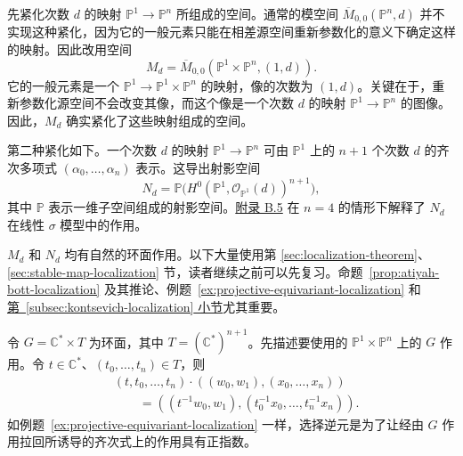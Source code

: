 先紧化次数 $d$ 的映射 $\mathbb P^1\to\mathbb P^n$ 所组成的空间。通常的模空间 $\overline M_{0,0}(\mathbb P^n,d)$ 并不实现这种紧化，因为它的一般元素只能在相差源空间重新参数化的意义下确定这样的映射。因此改用空间
\[
M_d=\overline M_{0,0}(\mathbb P^1\times\mathbb P^n,(1,d)).
\]
它的一般元素是一个 $\mathbb P^1\to\mathbb P^1\times\mathbb P^n$ 的映射，像的次数为 $(1,d)$。关键在于，重新参数化源空间不会改变其像，而这个像是一个次数 $d$ 的映射 $\mathbb P^1\to\mathbb P^n$ 的图像。因此，$M_d$ 确实紧化了这些映射组成的空间。

第二种紧化如下。一个次数 $d$ 的映射 $\mathbb P^1\to\mathbb P^n$ 可由 $\mathbb P^1$ 上的 $n+1$ 个次数 $d$ 的齐次多项式 $(\alpha_0,\ldots,\alpha_n)$ 表示。这导出射影空间
\[
N_d=\mathbb P\bigl(H^0(\mathbb P^1,\mathcal O_{\mathbb P^1}(d))^{n+1}\bigr),
\]
其中 $\mathbb P$ 表示一维子空间组成的射影空间。\hyperref[sec:gauged-linear-sigma-models]{附录 B.5} 在 $n=4$ 的情形下解释了 $N_d$ 在线性 $\sigma$ 模型中的作用。

$M_d$ 和 $N_d$ 均有自然的环面作用。以下大量使用第 \hyperref[sec:localization-theorem]{\ref*{sec:localization-theorem}}、\hyperref[sec:stable-map-localization]{\ref*{sec:stable-map-localization}} 节，读者继续之前可以先复习。命题~\ref{prop:atiyah-bott-localization} 及其推论、例题~\ref{ex:projective-equivariant-localization} 和\hyperref[subsec:kontsevich-localization]{第~\ref*{subsec:kontsevich-localization} 小节}尤其重要。

令 $G=\mathbb C^*\times T$ 为环面，其中 $T=(\mathbb C^*)^{n+1}$。先描述要使用的 $\mathbb P^1\times\mathbb P^n$ 上的 $G$ 作用。令 $t\in\mathbb C^*$、$(t_0,\ldots,t_n)\in T$，则
\[
\begin{aligned}
&(t,t_0,\ldots,t_n)\cdot((w_0,w_1),(x_0,\ldots,x_n))\\
&\qquad=((t^{-1}w_0,w_1),(t_0^{-1}x_0,\ldots,t_n^{-1}x_n)).
\end{aligned}
\]
如例题~\ref{ex:projective-equivariant-localization} 一样，选择逆元是为了让经由 $G$ 作用拉回所诱导的齐次式上的作用具有正指数。

